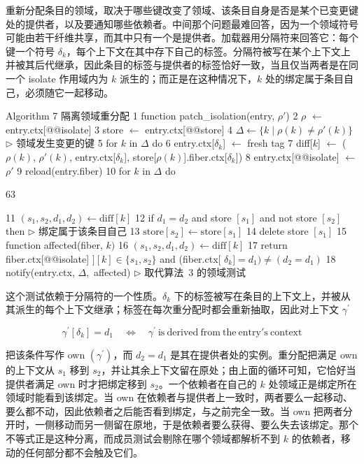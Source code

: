 重新分配条目的领域，取决于哪些键改变了领域、该条目自身是否是某个已变更键处的提供者，以及要通知哪些依赖者。中间那个问题最难回答，因为一个领域符号可能由若干纤维共享，而其中只有一个是提供者。加载器用分隔符来回答它：每个键一个符号 \(\delta _ { k }\)，每个上下文在其中存下自己的标签。分隔符被写在某个上下文上并被其后代继承，因此条目的标签与提供者的标签恰好一致，当且仅当两者是在同一个 isolate 作用域内为 \(k\) 派生的；而正是在这种情况下，\(k\) 处的绑定属于条目自己，必须随它一起移动。

Algorithm 7 隔离领域重分配 1 function
patch\_isolation(entry, $\rho'$) 2 $\rho$ $\leftarrow$ entry.ctx{[}@@isolate{]} 3 store $\leftarrow$
entry.ctx{[}@@store{]} 4 $\Delta \leftarrow \{ k \mid \rho(k) \neq \rho'(k) \}$ $\triangleright$ 领域发生变更的键 5 for $k$ in $\Delta$ do 6 entry.ctx{[}$\delta _ { k }${]} $\leftarrow$ fresh tag 7
diff{[}$k${]} $\leftarrow$ ($\rho(k)$, $\rho'(k)$, entry.ctx{[}$\delta _ { k }${]},
store{[}$\rho(k)${]}.fiber.ctx{[}$\delta _ { k }${]}) 8 entry.ctx{[}@@isolate{]} $\leftarrow$ $\rho'$ 9
reload(entry.fiber) 10 for $k$ in $\Delta$ do

63

11
\(( s _ { 1 } , s _ { 2 } , d _ { 1 } , d _ { 2 } ) \leftarrow \mathrm { d i f f } [ k ]\)
12 if \(d _ { 1 } = d _ { 2 }\) and store \(\left[ s _ { 1 } \right]\)
and not store \(\left[ s _ { 2 } \right]\) then \(\triangleright\) 绑定属于该条目自己 13
\(\mathrm { s t o r e } [ s _ { 2 } ] \gets \mathrm { s t o r e } [ s _ { 1 } ]\)
14 delete store \(\left[ s _ { 1 } \right]\) 15 function affected(fiber,
\(k)\) 16
\(( s _ { 1 } , s _ { 2 } , d _ { 1 } , d _ { 2 } ) \leftarrow \mathrm { d i f f } [ k ]\)
17 return fiber.ctx{[}@@isolate{]}
\(] [ k ] \in \{ s _ { 1 } , s _ { 2 } \}\) and (fiber.ctx{[}
\(\delta _ { k } ] = d _ { 1 } ) \neq ( d _ { 2 } = d _ { 1 } )\)
18 notify(entry.ctx, \(\Delta ,\) affected) $\triangleright$ 取代算法~3 的领域测试

这个测试依赖于分隔符的一个性质。\(\delta _ { k }\) 下的标签被写在条目的上下文上，并被从其派生的每个上下文继承；标签在每次重分配时都会重新抽取，因此对上下文 \(\gamma ^ { \prime }\)

\[
\gamma ^ { \prime } [ \delta _ { k } ] = d _ { 1 } \quad \Longleftrightarrow \quad \gamma ^ { \prime } { \mathrm { ~ i s ~ d e r i v e d ~ f r o m ~ t h e ~ e n t r y ' s ~ c o n t e x t } }\tag{65}
\]

把该条件写作 own \((\gamma ^ { \prime })\)，而 \(d _ { 2 } = d _ { 1 }\) 是其在提供者处的实例。重分配把满足 own 的上下文从 \(s _ { 1 }\) 移到 \(s _ { 2 }\)，并让其余上下文留在原处；由上面的循环可知，它恰好当提供者满足 own 时才把绑定移到 \(s _ { 2 }\)。一个依赖者在自己的 \(k\) 处领域正是绑定所在领域时能看到该绑定。当 own 在依赖者与提供者上一致时，两者要么一起移动、要么都不动，因此依赖者之后能否看到绑定，与之前完全一致。当 own 把两者分开时，一侧移动而另一侧留在原地，于是依赖者要么获得、要么失去该绑定。那个不等式正是这种分离，而成员测试会剔除在哪个领域都解析不到 \(k\) 的依赖者，移动的任何部分都不会触及它们。

